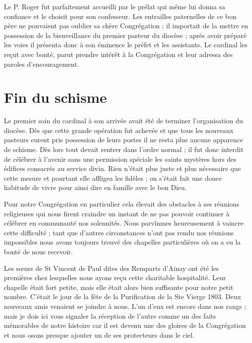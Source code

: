 Le P. Roger fut parfaitement accueilli par le prélat qui même lui donna sa confiance et le choisit pour son confesseur. Les entrailles paternelles de ce bon père ne pouvaient pas oublier sa chère Congrégation ; il importait de la mettre en possession
de la bienveillance du premier pasteur du diocèse ; après avoir préparé les voies il présenta donc à son éminence le préfet et les assistants. Le cardinal les reçut avec bonté, parut prendre intérêt à la Congrégation et leur adressa des paroles d'encouragement.

\section*{Fin du schisme}
Le premier soin du cardinal à son arrivée avait été de terminer l'organisation du diocèse. Dès que cette grande opération fut achevée et que tous les nouveaux pasteurs eurent pris possession de leurs postes il ne resta plus aucune apparence de schisme. Dès lors tout devait rentrer dans l'ordre normal ; il fut donc interdit de célébrer à l'avenir sans une permission spéciale les saints mystères hors des édifices consacrés au service divin. Rien n'était plus juste et plus nécessaire que cette mesure et pourtant elle affligea les fidèles ; on s'était fait une douce habitude de vivre pour ainsi dire en famille avec le bon Dieu.

Pour notre Congrégation en particulier cela élevait des obstacles à ses réunions religieuses qui nous firent craindre un instant de ne pas pouvoir continuer à célébrer en communauté nos solennités. Nous parvînmes heureusement à vaincre cette difficulté ; tant que d'autres circonstances n'ont pas rendu nos réunions impossibles nous avons toujours trouvé des chapelles particulières où on a eu la bonté de nous recevoir.

Les sœurs de St Vincent de Paul dites des Remparts d'Ainay ont été les premières chez lesquelles nous ayons reçu cette charitable hospitalité. Leur chapelle était fort petite, mais elle était alors bien suffisante pour notre petit nombre.
C'était le jour de la fête de la Purification de la Ste Vierge 1803. Deux nouveaux amis venaient se joindre à nous. L'un d'eux est encore dans nos rangs ; mais je dois ici vous signaler la réception de l'autre comme un des faits mémorables de notre histoire car il est devenu une des gloires de la Congrégation et nous osons presque ajouter un de ses protecteurs dans le ciel.

